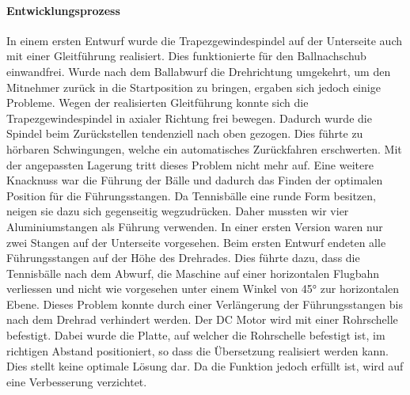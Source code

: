 \paragraph{Entwicklungsprozess}
In einem ersten Entwurf wurde die Trapezgewindespindel auf der Unterseite auch mit einer Gleitführung realisiert. Dies funktionierte für den Ballnachschub einwandfrei. Wurde nach dem Ballabwurf die Drehrichtung umgekehrt, um den Mitnehmer zurück in die Startposition zu bringen, ergaben sich jedoch einige Probleme. Wegen der realisierten Gleitführung konnte sich die Trapezgewindespindel in axialer Richtung frei bewegen. Dadurch wurde die Spindel beim Zurückstellen tendenziell nach oben gezogen. Dies führte zu hörbaren Schwingungen, welche ein automatisches Zurückfahren erschwerten. Mit der angepassten Lagerung tritt dieses Problem nicht mehr auf. 
Eine weitere Knacknuss war die Führung der Bälle und dadurch das Finden der optimalen Position für die Führungsstangen. Da Tennisbälle eine runde Form besitzen, neigen sie dazu sich gegenseitig wegzudrücken. Daher mussten wir vier Aluminiumstangen als Führung verwenden. In einer ersten Version waren nur zwei Stangen auf der Unterseite vorgesehen. 
Beim ersten Entwurf endeten alle Führungsstangen auf der Höhe des Drehrades. Dies führte dazu, dass die Tennisbälle nach dem Abwurf, die Maschine auf einer horizontalen Flugbahn verliessen und nicht wie vorgesehen unter einem Winkel von 45° zur horizontalen Ebene. Dieses Problem konnte durch einer Verlängerung der Führungsstangen bis nach dem Drehrad verhindert werden. 
Der DC Motor wird mit einer Rohrschelle befestigt. Dabei wurde die Platte, auf welcher die Rohrschelle befestigt ist, im richtigen Abstand positioniert, so dass die Übersetzung realisiert werden kann. Dies stellt keine optimale Lösung dar. Da die Funktion jedoch erfüllt ist, wird auf eine Verbesserung verzichtet. 
